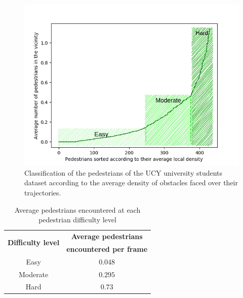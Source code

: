 \begin{itemize}
        \begin{figure}
        	\centering
        	\includegraphics[width=0.8\linewidth]{plots/ucy_students_density_divisions.png}
        	\caption{Classification of the pedestrians of the UCY university students dataset according to the average density of obstacles faced over their trajectories.}
        	\label{fig:ucy_ped_density_division}
        \end{figure}
		\begin{table}[htbp]
			\begin{center}
			\renewcommand{\arraystretch}{1.3}
				\begin{tabular}{|c|c|}
					\hline
					\multirow{2}{*}{\textbf{Difficulty level}} & \textbf{Average pedestrians} \\
										& \textbf{encountered per frame} \\
				    \hline
					Easy & $0.048$ \\
					Moderate & $0.295$ \\
					Hard & $0.73$\\
				   \hline
				\end{tabular}
			\caption{Average pedestrians encountered at each pedestrian difficulty level}
			\label{tab:ucy_difficulty_level_division}
			\end{center}
		\end{table}
\end{itemize}

